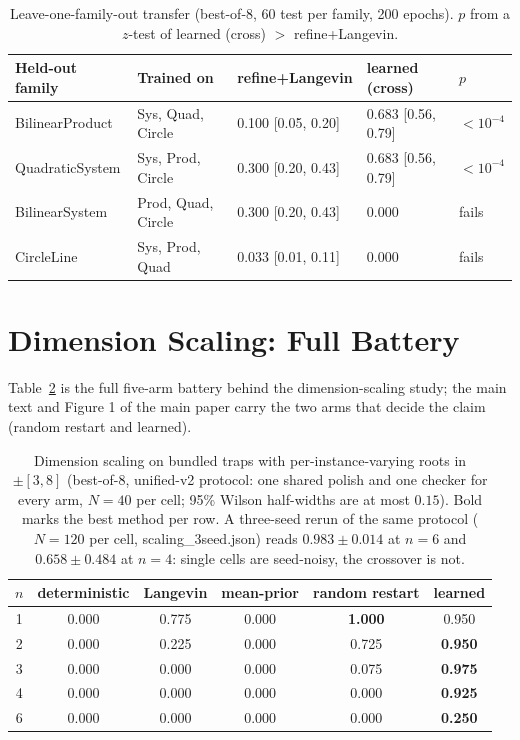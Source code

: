 \begin{table}[ht]
\centering
\caption{Leave-one-family-out transfer (best-of-8, 60 test per family, 200 epochs). $p$ from
a $z$-test of learned (cross) $>$ refine+Langevin.}
\label{tab:transfer}
\small
\begin{tabular}{lllll}
\toprule
Held-out family & Trained on & refine+Langevin & learned (cross) & $p$ \\
\midrule
BilinearProduct & Sys, Quad, Circle  & 0.100 [0.05, 0.20] & 0.683 [0.56, 0.79] & $<10^{-4}$ \\
QuadraticSystem & Sys, Prod, Circle  & 0.300 [0.20, 0.43] & 0.683 [0.56, 0.79] & $<10^{-4}$ \\
BilinearSystem  & Prod, Quad, Circle & 0.300 [0.20, 0.43] & 0.000 & fails \\
CircleLine      & Sys, Prod, Quad    & 0.033 [0.01, 0.11] & 0.000 & fails \\
\bottomrule
\end{tabular}
\end{table}

\section{Dimension Scaling: Full Battery}
\label{app:scaling}

Table~\ref{tab:scaling} is the full five-arm battery behind the dimension-scaling study; the main text and
Figure 1 of the main paper carry the two arms that decide the claim (random restart and learned).

\begin{table}[ht]
\centering
\caption{Dimension scaling on bundled traps with per-instance-varying roots in $\pm[3,8]$
(best-of-8, unified-v2 protocol: one shared polish and one checker for every arm, $N{=}40$
per cell; 95\% Wilson half-widths are at most $0.15$). Bold marks the best method per
row. A three-seed rerun of the same protocol ($N{=}120$ per cell,
scaling\_3seed.json) reads $0.983 \pm 0.014$ at $n{=}6$ and $0.658 \pm 0.484$ at
$n{=}4$: single cells are seed-noisy, the crossover is not.}
\label{tab:scaling}
\begin{tabular}{cccccc}
\toprule
$n$ & deterministic & Langevin & mean-prior & random restart & learned \\
\midrule
1 & 0.000 & 0.775 & 0.000 & \textbf{1.000} & 0.950 \\
2 & 0.000 & 0.225 & 0.000 & 0.725 & \textbf{0.950} \\
3 & 0.000 & 0.000 & 0.000 & 0.075 & \textbf{0.975} \\
4 & 0.000 & 0.000 & 0.000 & 0.000 & \textbf{0.925} \\
6 & 0.000 & 0.000 & 0.000 & 0.000 & \textbf{0.250} \\
\bottomrule
\end{tabular}
\end{table}

